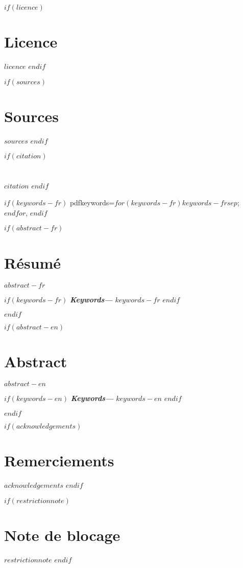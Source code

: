 \renewcommand{\contentsname}{Table des matières}
\renewcommand{\figurename}{Illustration}
\renewcommand{\listfigurename}{Table des figures}

$if(licence)$
    \chapter*{Licence}
    $licence$
$endif$

$if(sources)$
    \chapter*{Sources}
    $sources$
$endif$

$if(citation)$
    \chapter*{}
    $citation$
$endif$

\providecommand{\keywords}[1]{\textbf{\textit{Keywords---}} #1}
$if(keywords-fr)$
    pdfkeywords={$for(keywords-fr)$$keywords-fr$$sep$; $endfor$},
$endif$

$if(abstract-fr)$
\clearpage
\begin{minipage}{\linewidth}
    
    \chapter*{Résumé}
    $abstract-fr$
    
    \vspace*{1cm}
    
    $if(keywords-fr)$
        \keywords{$keywords-fr$}
    $endif$
    
\end{minipage}
\clearpage
$endif$

$if(abstract-en)$
    \clearpage
    \begin{minipage}{\linewidth}
    \chapter*{Abstract}
    $abstract-en$

    \vspace*{1cm}

    $if(keywords-en)$
        \keywords{$keywords-en$}
    $endif$

    \end{minipage}
    \clearpage
$endif$



$if(acknowledgements)$
\chapter*{Remerciements}
$acknowledgements$
$endif$

$if(restrictionnote)$
\chapter*{Note de blocage}
$restrictionnote$
$endif$

\cleardoublepage